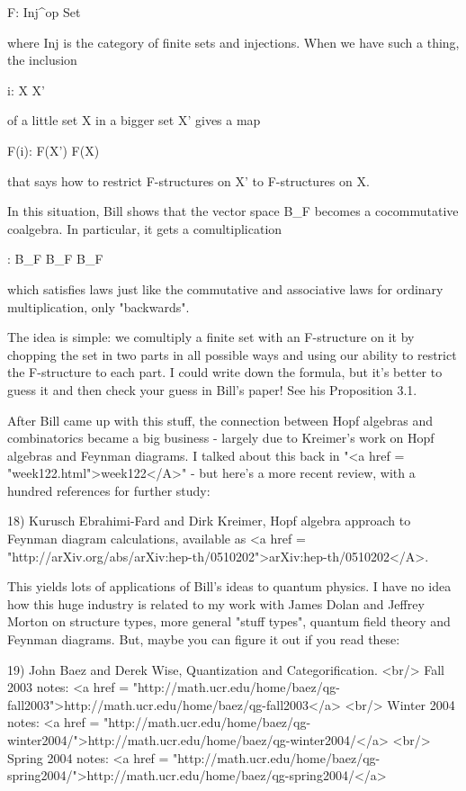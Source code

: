 F: Inj^{op} \to  Set

where Inj is the category of finite sets and injections.  When
we have such a thing, the inclusion 

i: X \to  X'

of a little set X in a bigger set X' gives a map

F(i): F(X') \to  F(X)

that says how to restrict F-structures on X' to F-structures
on X.

In this situation, Bill shows that the vector space B_{F} becomes
a cocommutative coalgebra.  In particular, it gets a comultiplication

\Delta : B_{F} \to  B_{F} \otimes  B_{F}

which satisfies laws just like the commutative and associative laws
for ordinary multiplication, only "backwards".  

The idea is simple: we comultiply a finite set with an F-structure on it
by chopping the set in two parts in all possible ways and using our 
ability to restrict the F-structure to each part.   I could write down 
the formula, but it's better to guess it and then check your guess in 
Bill's paper!  See his Proposition 3.1.

After Bill came up with this stuff, the connection between Hopf algebras
and combinatorics became a big business - largely due to Kreimer's work 
on Hopf algebras and Feynman diagrams.  I talked about this back in 
"<a href = "week122.html">week122</A>" - but here's a more recent review, with a hundred references 
for further study:

18) Kurusch Ebrahimi-Fard and Dirk Kreimer, Hopf algebra approach 
to Feynman diagram calculations, available as <a href = "http://arXiv.org/abs/arXiv:hep-th/0510202">arXiv:hep-th/0510202</A>.

This yields lots of applications of Bill's ideas to quantum physics.
I have no idea how this huge industry is related to my work with James 
Dolan and Jeffrey Morton on structure types, more general "stuff 
types", quantum field theory and Feynman diagrams.  But, maybe you
can figure it out if you read these:

19) John Baez and Derek Wise, Quantization and Categorification. <br/>
Fall 2003 notes: <a href = "http://math.ucr.edu/home/baez/qg-fall2003">http://math.ucr.edu/home/baez/qg-fall2003</a> <br/>
Winter 2004 notes: <a href = "http://math.ucr.edu/home/baez/qg-winter2004/">http://math.ucr.edu/home/baez/qg-winter2004/</a> <br/>
Spring 2004 notes: <a href = "http://math.ucr.edu/home/baez/qg-spring2004/">http://math.ucr.edu/home/baez/qg-spring2004/</a>

